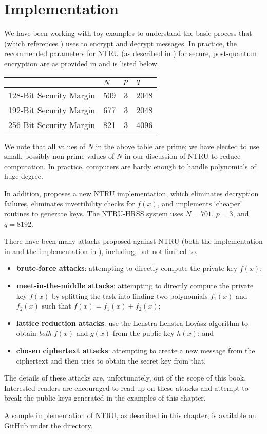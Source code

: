 \newpage

\section{Implementation}
We have been working with toy examples to understand the basic process that \cite{hoffstein_pipher_silverman_1998} (which references \cite{hoffstein_pipher_silverman_1996}) uses to encrypt and decrypt messages. In practice, the recommended parameters for NTRU (as described in \cite{hoffstein_pipher_silverman_1998}) for secure, post-quantum encryption are as provided in \cite{ntru_2020} and is listed below.
\begin{table}[H]
    \centering
    \begin{tabular}{|l|l|l|l|}
        \hline
        & $N$ & $p$ & $q$ \\ \hline
        128-Bit Security Margin & 509 & 3 & 2048 \\ \hline
        192-Bit Security Margin & 677 & 3 & 2048 \\ \hline
        256-Bit Security Margin & 821 & 3 & 4096 \\ \hline
    \end{tabular}
\end{table}

We note that all values of $N$ in the above table are prime; we have elected to use small, possibly non-prime values of $N$ in our discussion of NTRU to reduce computation. In practice, computers are hardy enough to handle polynomials of huge degree.

In addition, \cite{hulsing_rijneveld_schanck_schwabe_2018} proposes a new NTRU implementation, which eliminates decryption failures, eliminates invertibility checks for $f(x)$, and implements `cheaper' routines to generate keys. The NTRU-HRSS system uses $N = 701$, $p = 3$, and $q = 8192$.

There have been many attacks proposed against NTRU (both the implementation in \cite{hoffstein_pipher_silverman_1996} and the implementation in \cite{hulsing_rijneveld_schanck_schwabe_2018}), including, but not limited to,
\begin{itemize}
    \item \textbf{brute-force attacks}: attempting to directly compute the private key $f(x)$;
    \item \textbf{meet-in-the-middle attacks}: attempting to directly compute the private key $f(x)$ by splitting the task into finding two polynomials $f_1(x)$ and $f_2(x)$ such that $f(x) = f_1(x) + f_2(x)$;
    \item \textbf{lattice reduction attacks}: use the Lenstra-Lenstra-Lov\`asz algorithm to obtain \textit{both} $f(x)$ and $g(x)$ from the public key $h(x)$; and
    \item \textbf{chosen ciphertext attacks}: attempting to create a new message from the ciphertext and then tries to obtain the secret key from that.
\end{itemize}
The details of these attacks are, unfortunately, out of the scope of this book. Interested readers are encouraged to read up on these attacks and attempt to break the public keys generated in the examples of this chapter.

A sample implementation of NTRU, as described in this chapter, is available on \href{https://github.com/PhotonicGluon/Abstract-Algebra-Book}{GitHub} under the  directory.
